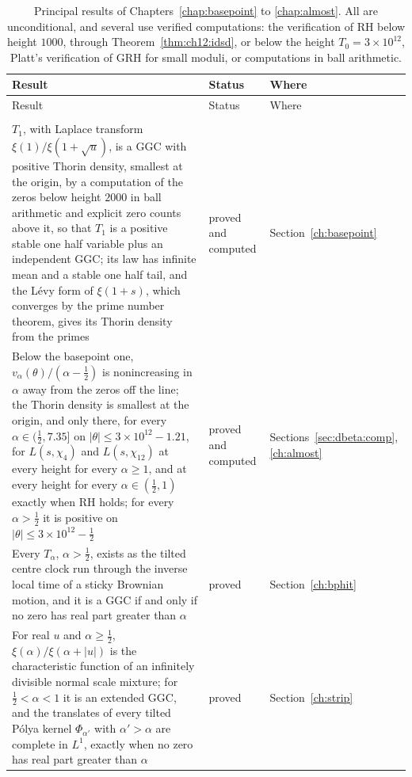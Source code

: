 {\footnotesize
\begin{longtable}{p{}p{}p{}}
\toprule
Result & Status & Where\\
\midrule
\endfirsthead
\toprule
Result & Status & Where\\
\midrule
\endhead
\bottomrule
\endfoot
\bottomrule
\caption{Principal results of Chapters~\ref{chap:basepoint} to \ref{chap:almost}. All are unconditional, and several use verified computations: the verification of RH below height $1000$, through Theorem~\ref{thm:ch12:idsd}, or below the height $T_0=3\times10^{12}$, Platt's verification of GRH for small moduli, or computations in ball arithmetic.}\label{tab:intro:summary6}\\
\endlastfoot
$T_1$, with Laplace transform $\xi(1)/\xi(1+\sqrt u)$, is a GGC with positive Thorin density, smallest at the origin, by a computation of the zeros below height $2000$ in ball arithmetic and explicit zero counts above it, so that $T_1$ is a positive stable one half variable plus an independent GGC; its law has infinite mean and a stable one half tail, and the L\'evy form of $\xi(1+s)$, which converges by the prime number theorem, gives its Thorin density from the primes & \raggedright proved and computed & Section~\ref{ch:basepoint}\\
Below the basepoint one, $v_\alpha(\theta)/(\alpha-\frac12)$ is nonincreasing in $\alpha$ away from the zeros off the line; the Thorin density is smallest at the origin, and only there, for every $\alpha\in(\frac12,7.35]$ on $|\theta|\le3\times10^{12}-1.21$, for $L(s,\chi_4)$ and $L(s,\chi_{12})$ at every height for every $\alpha\ge1$, and at every height for every $\alpha\in(\frac12,1)$ exactly when RH holds; for every $\alpha>\frac12$ it is positive on $|\theta|\le3\times10^{12}-\frac12$ & \raggedright proved and computed & Sections~\ref{sec:dbeta:comp}, \ref{ch:almost}\\
Every $T_\alpha$, $\alpha>\frac12$, exists as the tilted centre clock run through the inverse local time of a sticky Brownian motion, and it is a GGC if and only if no zero has real part greater than $\alpha$ & \raggedright proved & Section~\ref{ch:bphit}\\
For real $u$ and $\alpha\ge\frac12$, $\xi(\alpha)/\xi(\alpha+|u|)$ is the characteristic function of an infinitely divisible normal scale mixture; for $\frac12<\alpha<1$ it is an extended GGC, and the translates of every tilted P\'olya kernel $\Phi_{\alpha'}$ with $\alpha'>\alpha$ are complete in $L^1$, exactly when no zero has real part greater than $\alpha$ & \raggedright proved & Section~\ref{ch:strip}\\

\end{longtable}}
